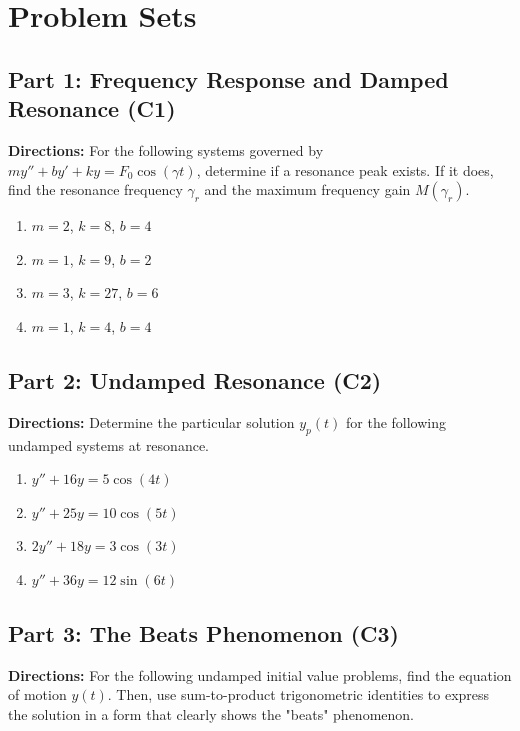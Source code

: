 \documentclass[11pt]{article}
\begin{document}
\newpage

\section{Problem Sets}

\subsection*{Part 1: Frequency Response and Damped Resonance (C1)}
\noindent \textbf{Directions:} For the following systems governed by $my'' + by' + ky = F_0 \cos(\gamma t)$, determine if a resonance peak exists. If it does, find the resonance frequency $\gamma_r$ and the maximum frequency gain $M(\gamma_r)$.

\begin{enumerate}[label=\textbf{\arabic*.}]
    \item $m = 2$, $k = 8$, $b = 4$
    \item $m = 1$, $k = 9$, $b = 2$
    \item $m = 3$, $k = 27$, $b = 6$
    \item $m = 1$, $k = 4$, $b = 4$
\end{enumerate}

\subsection*{Part 2: Undamped Resonance (C2)}
\noindent \textbf{Directions:} Determine the particular solution $y_p(t)$ for the following undamped systems at resonance.

\begin{enumerate}[label=\textbf{\arabic*.}, resume]
    \item $y'' + 16y = 5 \cos(4t)$
    \item $y'' + 25y = 10 \cos(5t)$
    \item $2y'' + 18y = 3 \cos(3t)$
    \item $y'' + 36y = 12 \sin(6t)$
\end{enumerate}

\subsection*{Part 3: The Beats Phenomenon (C3)}
\noindent \textbf{Directions:} For the following undamped initial value problems, find the equation of motion $y(t)$. Then, use sum-to-product trigonometric identities to express the solution in a form that clearly shows the "beats" phenomenon.
\end{document}
